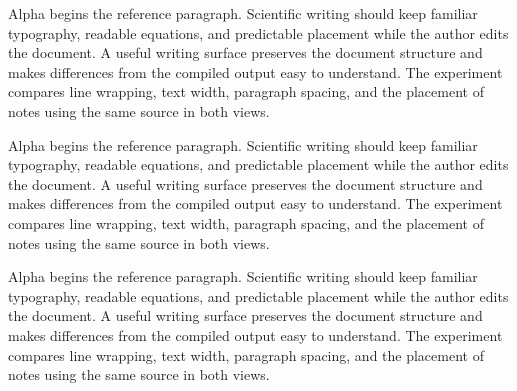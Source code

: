 \documentclass[10pt,twocolumn]{article}
\begin{document}
Alpha begins the reference paragraph. Scientific writing should keep familiar typography, readable equations, and predictable placement while the author edits the document. A useful writing surface preserves the document structure and makes differences from the compiled output easy to understand. The experiment compares line wrapping, text width, paragraph spacing, and the placement of notes using the same source in both views.

Alpha begins the reference paragraph. Scientific writing should keep familiar typography, readable equations, and predictable placement while the author edits the document. A useful writing surface preserves the document structure and makes differences from the compiled output easy to understand. The experiment compares line wrapping, text width, paragraph spacing, and the placement of notes using the same source in both views.

Alpha begins the reference paragraph. Scientific writing should keep familiar typography, readable equations, and predictable placement while the author edits the document. A useful writing surface preserves the document structure and makes differences from the compiled output easy to understand. The experiment compares line wrapping, text width, paragraph spacing, and the placement of notes using the same source in both views.
\end{document}
